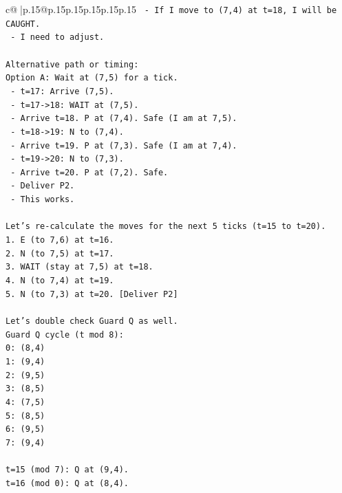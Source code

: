 \documentclass{article}
\begin{document}
{\begin{supertabular}{c@{$\;$}|p{.15\linewidth}@{}p{.15\linewidth}p{.15\linewidth}p{.15\linewidth}p{.15\linewidth}p{.15\linewidth}}
{{{\texttt{  {-} If I move to (7,4) at t=18, I will be CAUGHT.} \\
\texttt{  {-} I need to adjust.} \\
\\ 
\texttt{Alternative path or timing:} \\
\texttt{Option A: Wait at (7,5) for a tick.} \\
\texttt{  {-} t=17: Arrive (7,5).} \\
\texttt{  {-} t=17{-}>18: WAIT at (7,5).} \\
\texttt{    {-} Arrive t=18. P at (7,4). Safe (I am at 7,5).} \\
\texttt{  {-} t=18{-}>19: N to (7,4).} \\
\texttt{    {-} Arrive t=19. P at (7,3). Safe (I am at 7,4).} \\
\texttt{  {-} t=19{-}>20: N to (7,3).} \\
\texttt{    {-} Arrive t=20. P at (7,2). Safe.} \\
\texttt{    {-} Deliver P2.} \\
\texttt{  {-} This works.} \\
\\ 
\texttt{Let's re{-}calculate the moves for the next 5 ticks (t=15 to t=20).} \\
\texttt{1. E (to 7,6) at t=16.} \\
\texttt{2. N (to 7,5) at t=17.} \\
\texttt{3. WAIT (stay at 7,5) at t=18.} \\
\texttt{4. N (to 7,4) at t=19.} \\
\texttt{5. N (to 7,3) at t=20. {[}Deliver P2{]}} \\
\\ 
\texttt{Let's double check Guard Q as well.} \\
\texttt{Guard Q cycle (t mod 8):} \\
\texttt{0: (8,4)} \\
\texttt{1: (9,4)} \\
\texttt{2: (9,5)} \\
\texttt{3: (8,5)} \\
\texttt{4: (7,5)} \\
\texttt{5: (8,5)} \\
\texttt{6: (9,5)} \\
\texttt{7: (9,4)} \\
\\ 
\texttt{t=15 (mod 7): Q at (9,4).} \\
\texttt{t=16 (mod 0): Q at (8,4).} \\
}}}
\end{supertabular}}
\end{document}
